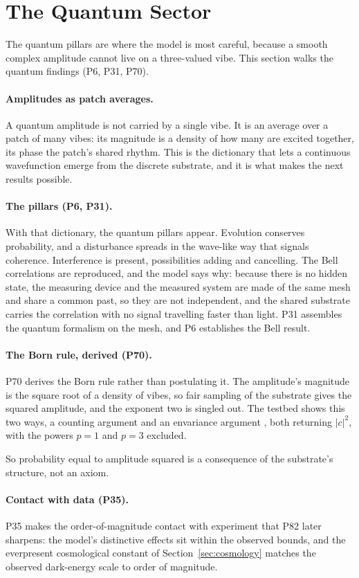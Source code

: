 \section{The Quantum Sector}
\label{sec:quantum}

The quantum pillars are where the model is most careful, because a smooth complex amplitude cannot
live on a three-valued vibe. This section walks the quantum findings (P6, P31, P70).

\paragraph{Amplitudes as patch averages.}
A quantum amplitude is not carried by a single vibe. It is an average over a patch of many vibes:
its magnitude is a density of how many are excited together, its phase the patch's shared rhythm.
This is the dictionary that lets a continuous wavefunction emerge from the discrete substrate, and
it is what makes the next results possible.

\paragraph{The pillars (P6, P31).}
With that dictionary, the quantum pillars appear. Evolution conserves probability, and a disturbance
spreads in the wave-like way that signals coherence. Interference is present, possibilities adding
and cancelling. The Bell correlations are reproduced, and the model says why: because there is no
hidden state, the measuring device and the measured system are made of the same mesh and share a
common past, so they are not independent, and the shared substrate carries the correlation with no
signal travelling faster than light. P31 assembles the quantum formalism on the mesh, and P6
establishes the Bell result.

\paragraph{The Born rule, derived (P70).}
P70 derives the Born rule rather than postulating it. The amplitude's magnitude is the square root
of a density of vibes, so fair sampling of the substrate gives the squared amplitude, and the
exponent two is singled out. The testbed shows this two ways, a counting argument and an
envariance argument \citep{zurek2005probabilities}, both returning $|c|^2$, with the powers $p = 1$ and $p = 3$
excluded.

 So probability equal to amplitude squared is a consequence of the substrate's structure,
not an axiom.

\paragraph{Contact with data (P35).}
P35 makes the order-of-magnitude contact with experiment that P82 later sharpens: the model's
distinctive effects sit within the observed bounds, and the everpresent cosmological constant of
Section~\ref{sec:cosmology} matches the observed dark-energy scale to order of magnitude.
